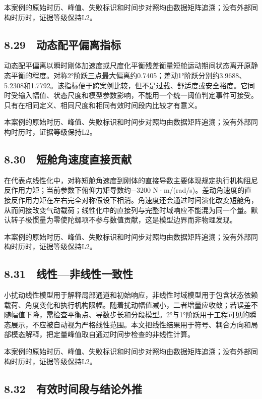 \documentclass[UTF8,12pt,openany]{ctexbook}
\begin{document}
本案例的原始时历、峰值、失败标识和时间步对照均由数据矩阵追溯；没有外部同构时历时，证据等级保持L2。

\subsection{8.29　动态配平偏离指标}

动态配平偏离以瞬时刚体加速度或尺度化平衡残差衡量短舱运动期间状态离开原静态平衡的程度。对称2°阶跃三点最大偏离约0.7405；差动1°阶跃分别约3.9688、5.2308和1.7792。该指标便于跨案例比较，但不是过载、舒适度或安全裕度。它同时受输入幅值、状态尺度和模型参数影响，不能用一个统一阈值判定事件可接受。只有在相同定义、相同尺度和相同有效时间段内比较才有意义。

本案例的原始时历、峰值、失败标识和时间步对照均由数据矩阵追溯；没有外部同构时历时，证据等级保持L2。

\subsection{8.30　短舱角速度直接贡献}

在代表点线性化中，对称短舱角速度到刚体的直接导数主要体现规定执行机构阻尼反作用力矩；当前参数下俯仰力矩导数约−3200 N·m/(rad/s)。差动角速度的直接反作用力矩在左右完全对称假设下相消。角速度还会通过时间演化改变短舱角，从而间接改变气动载荷；线性化中的直接列与完整时域响应不能混为同一个量。默认转子极惯量为零使陀螺项不参与数值贡献，这是模型边界而非物理发现。

本案例的原始时历、峰值、失败标识和时间步对照均由数据矩阵追溯；没有外部同构时历时，证据等级保持L2。

\subsection{8.31　线性—非线性一致性}

小扰动线性模型用于解释局部通道和初始响应，非线性时域模型用于包含状态依赖载荷、角度变化和执行机构限幅。随着扰动幅值减小，二者增量应收敛；若误差不随幅值下降，需检查平衡点、导数步长和分段模型。2°与1°阶跃用于工程可见的瞬态展示，不应被自动视为严格线性范围。本文把线性结果用于符号、耦合方向和局部模态解释，把定量峰值取自通过时间步检查的非线性计算。

本案例的原始时历、峰值、失败标识和时间步对照均由数据矩阵追溯；没有外部同构时历时，证据等级保持L2。

\subsection{8.32　有效时间段与结论外推}
\end{document}
